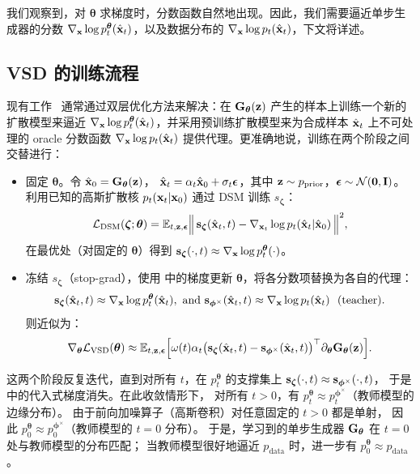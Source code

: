 我们观察到，对 $\bm{\theta}$ 求梯度时，分数函数自然地出现。因此，我们需要逼近单步生成器的分数 $\nabla_{{\mathbf{x}}}\log p_t^{\bm{\theta}}(\hat{{\mathbf{x}}}_t)$，以及数据分布的 $\nabla_{{\mathbf{x}}}\log p_t(\hat{{\mathbf{x}}}_t)$，下文将详述。









\subsection{VSD 的训练流程}\label{subsec:vsd-training}
现有工作~\citep{yin2024one,yin2024improved,pooledreamfusion,wang2023prolificdreamer,luo2023diff,lu2024simplifying} 通常通过双层优化方法来解决：在 ${\mathbf{G}}_{\bm{\theta}}({\mathbf{z}})$ 产生的样本上训练一个新的扩散模型来逼近 $\nabla_{{\mathbf{x}}} \log p_t^{\bm{\theta}}(\hat{{\mathbf{x}}}_t)$，并采用预训练扩散模型来为合成样本 $\hat{{\mathbf{x}}}_t$ 上不可处理的 oracle 分数函数 $\nabla_{{\mathbf{x}}} \log p_t(\hat{{\mathbf{x}}}_t)$ 提供代理。更准确地说，训练在两个阶段之间交替进行：
\begin{itemize}
    \item {} 固定 $\bm{\theta}$。令 $\hat{{\mathbf{x}}}_0={\mathbf{G}}_{\bm{\theta}}({\mathbf{z}})$，
    $\hat{{\mathbf{x}}}_t=\alpha_t \hat{{\mathbf{x}}}_0+\sigma_t{\bm{\epsilon}}$，其中 ${\mathbf{z}}\sim p_{\mathrm{prior}}$，${\bm{\epsilon}}\sim\mathcal{N}(\bm{0},{\mathbf{I}})$。
    利用已知的高斯扩散核 $p_t({\mathbf{x}}_t|{\mathbf{x}}_0)$ 通过 DSM 训练 $s_{\bm{\zeta}}$：
    \[
    \mathcal{L}_{\text{DSM}}(\bm{\zeta};\bm{\theta})
    =\mathbb{E}_{t,{\mathbf{z}},{\bm{\epsilon}}}\Big\|\,{\mathbf{s}}_{\bm{\zeta}}(\hat{{\mathbf{x}}}_t,t)
    - \nabla_{{\mathbf{x}}_t}\log p_t(\hat{{\mathbf{x}}}_t|\hat{{\mathbf{x}}}_0)\,\Big\|^2,
    \]
    在最优处（对固定的 $\bm{\theta}$）得到 ${\mathbf{s}}_{\bm{\zeta}}(\cdot,t)\approx \nabla_{{\mathbf{x}}}\log p_t^{\bm{\theta}}(\cdot)$。
    

  \item {} 冻结 $s_{\bm{\zeta}}$（stop-grad），使用  中的梯度更新 $\bm{\theta}$，将各分数项替换为各自的代理：
  \[
    {\mathbf{s}}_{\bm{\zeta}}(\hat{{\mathbf{x}}}_t,t)\approx \nabla_{{\mathbf{x}}}\log p_t^{\bm{\theta}}(\hat{{\mathbf{x}}}_t), \,\, \text{and} \,\, {\mathbf{s}}_{\bm{\phi}^\times}(\hat{{\mathbf{x}}}_t,t)\approx \nabla_{{\mathbf{x}}}\log p_t(\hat{{\mathbf{x}}}_t)\ \ \text{(teacher)}.
  \]
   则近似为：
  \[
    \nabla_{\bm{\theta}}\mathcal{L}_{\text{VSD}}(\bm{\theta})
    \approx \mathbb{E}_{t,{\mathbf{z}},\bm{\epsilon}}\Big[\omega(t)\alpha_t
      \big({\mathbf{s}}_{\bm{\zeta}}(\hat{{\mathbf{x}}}_t,t) - {\mathbf{s}}_{\bm{\phi}^\times}(\hat{{\mathbf{x}}}_t,t)\big)^{\top}
      \partial_{\bm{\theta}}{\mathbf{G}}_{\bm{\theta}}({\mathbf{z}})
    \Big].
  \]
\end{itemize}
这两个阶段反复迭代，直到对所有 $t$，在 $p_t^{\bm{\theta}}$ 的支撑集上
${\mathbf{s}}_{\bm{\zeta}}(\cdot,t)\approx {\mathbf{s}}_{\bm{\phi}^\times}(\cdot,t)$，
于是  中的代入式梯度消失。在此收敛情形下，
对所有 $t>0$，有 $p_t^{\bm{\theta}}\approx p_t^{\bm{\phi}^\times}$（教师模型的边缘分布）。
由于前向加噪算子（高斯卷积）对任意固定的 $t>0$ 都是单射，
因此 $p_0^{\bm{\theta}}\approx p_0^{\bm{\phi}^\times}$（教师模型的 $t=0$ 分布）。
于是，学习到的单步生成器 ${\mathbf{G}}_{\bm{\theta}}$ 在 $t=0$ 处与教师模型的分布匹配；
当教师模型很好地逼近 $p_{\mathrm{data}}$ 时，进一步有 $p_0^{\bm{\theta}}\approx p_{\mathrm{data}}$。


